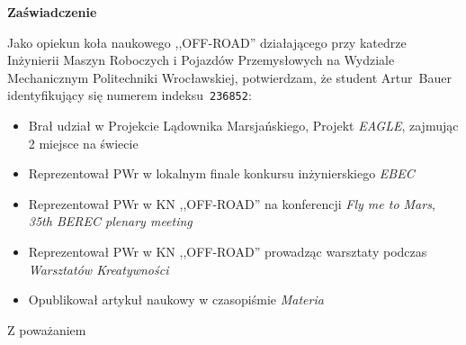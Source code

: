 \documentclass[11pt,a4paper]{letter} %
\date{Wrocław, 20 września 2018}
\begin{document}
\begin{letter}{}
\opening{}

\begin{center}
  \huge
  \textbf{Zaświadczenie}
\end{center}

 Jako opiekun koła naukowego ,,OFF-ROAD'' działającego przy katedrze Inżynierii Maszyn Roboczych i Pojazdów Przemysłowych na Wydziale Mechanicznym Politechniki Wrocławskiej, potwierdzam, że student Artur~Bauer identyfikujący się numerem indeksu~\texttt{236852}:
\begin{itemize}
    \item Brał udział w Projekcie Lądownika Marsjańskiego, Projekt \textit{EAGLE}, zajmując 2 miejsce na świecie
    \item Reprezentował PWr w lokalnym finale konkursu inżynierskiego \textit{EBEC}
    \item Reprezentował PWr w KN ,,OFF-ROAD'' na konferencji \textit{Fly me to Mars}, \textit{35th BEREC plenary meeting}
    \item Reprezentował PWr w KN ,,OFF-ROAD'' prowadząc warsztaty podczas \textit{Warsztatów Kreatywności} 
    \item Opublikował artykuł naukowy w czasopiśmie \textit{Materia}
\end{itemize}
\closing{Z poważaniem}

\end{letter}
\end{document}
